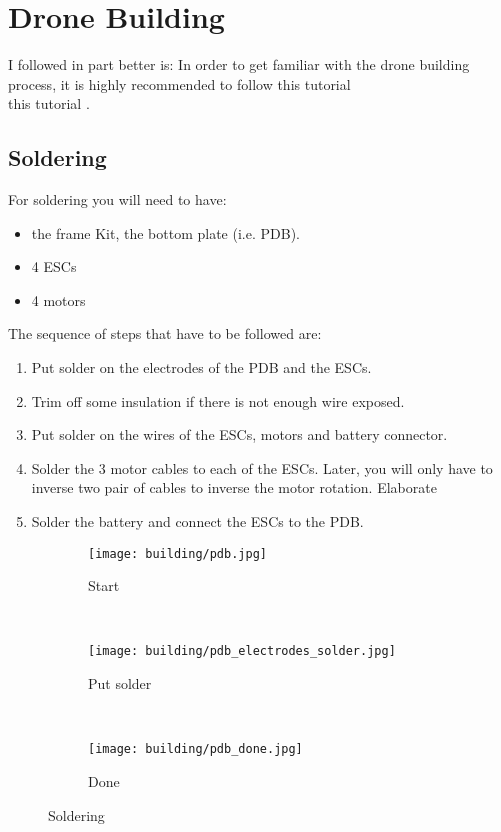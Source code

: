 \chapter{Drone Building}
I followed in part {\color{red}better is: In order to get familiar with the drone building process, it is highly recommended to follow this tutorial\\} this tutorial \cite{udemy_build_course}.

\section{Soldering}
For soldering you will need to have:
\begin{itemize}
    \item the frame Kit, the bottom plate (i.e. PDB).
    \item 4 ESCs
    \item 4 motors
\end{itemize}
The sequence of steps that have to be followed are:
\begin{enumerate}
    \item Put solder on the electrodes of the PDB and the ESCs.
    \item Trim off some insulation if there is not enough wire exposed.
    \item Put solder on the wires of the ESCs, motors and battery connector.
    \item Solder the 3 motor cables to each of the ESCs. Later, you will only have to inverse two pair of cables to inverse the motor rotation. {\color{orange} Elaborate}
    \item Solder the battery and connect the ESCs to the PDB.
\end{enumerate}
\begin{figure}[!ht]
    \centering
    \begin{subfigure}[b]{0.3\textwidth}
        \texttt{[image: building/pdb.jpg]}
        \caption{Start}
        \label{fig:pdb}
    \end{subfigure}
    ~
    \begin{subfigure}[b]{0.3\textwidth}
        \texttt{[image: building/pdb\_electrodes\_solder.jpg]}
        \caption{Put solder}
        \label{fig:pdb_electrodes_solder}
    \end{subfigure}
    ~
    \begin{subfigure}[b]{0.3\textwidth}
        \texttt{[image: building/pdb\_done.jpg]}
        \caption{Done}
        \label{fig:pdb_done}
    \end{subfigure}
    \caption{Soldering}\label{fig:soldering}
\end{figure}


